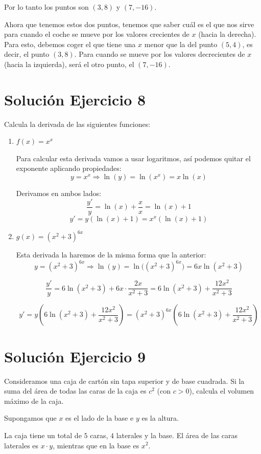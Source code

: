 \documentclass[12pt]{article}
\begin{document}
Por lo tanto los puntos son \((3,8)\) y \((7,-16)\).

Ahora que tenemos estos dos puntos, tenemos que saber cuál es el que nos sirve
para cuando el coche se mueve por los valores crecientes de \(x\) (hacia la derecha).
Para esto, debemos coger el que tiene una \(x\) menor que la del punto \((5,4)\), es
decir, el punto \((3,8)\). Para cuando se mueve por los valores decrecientes de \(x\)
(hacia la izquierda), será el otro punto, el \((7,-16)\).

\section*{Solución Ejercicio 8}
Calcula la derivada de las siguientes funciones:

\begin{enumerate}[label=\alph*)]
\item \(f(x)=x^x\)

Para calcular esta derivada vamos a usar logaritmos, así podemos quitar el
exponente aplicando propiedades:
\[
y=x^x \Rightarrow \ln(y)=\ln(x^x)=x\ln(x)
\]

Derivamos en ambos lados:
\[
\frac{y'}{y}=\ln(x)+\frac{x}{x}=\ln(x)+1
\]
\[
y'=y(\ln(x)+1)=x^x(\ln(x)+1)
\]

\item \(g(x)=(x^2+3)^{6x}\)

Esta derivada la haremos de la misma forma que la anterior:
\[
y=(x^2+3)^{6x} \Rightarrow \ln(y)=\ln\big((x^2+3)^{6x}\big)=6x\ln(x^2+3)
\]

\[
\frac{y'}{y}
=6\ln(x^2+3)+6x\cdot \frac{2x}{x^2+3}
=6\ln(x^2+3)+\frac{12x^2}{x^2+3}
\]

\[
y'
=y\left(6\ln(x^2+3)+\frac{12x^2}{x^2+3}\right)
=(x^2+3)^{6x}\left(6\ln(x^2+3)+\frac{12x^2}{x^2+3}\right)
\]
\end{enumerate}

\section*{Solución Ejercicio 9}
Consideramos una caja de cartón sin tapa superior y de base cuadrada. Si la suma del área de todas las caras de la caja es \(c^2\) (con \(c>0\)), calcula el volumen máximo de la caja.

Supongamos que \(x\) es el lado de la base e \(y\) es la altura.

La caja tiene un total de \(5\) caras, \(4\) laterales y la base. El área de las caras
laterales es \(x\cdot y\), mientras que en la base es \(x^2\).
\end{document}

